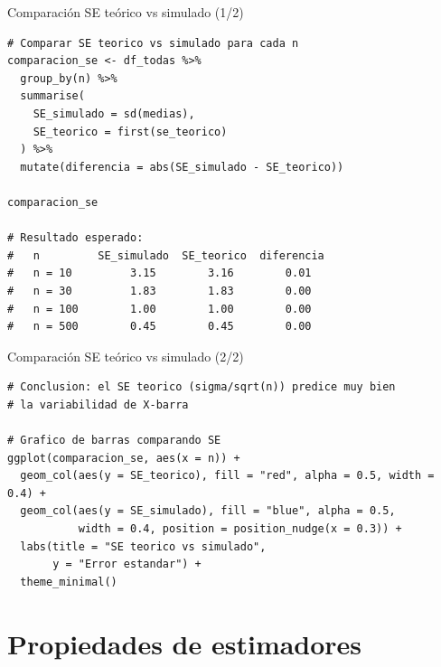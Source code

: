 \documentclass[aspectratio=169, 11pt]{beamer}
\begin{document}
\begin{frame}[fragile]{Comparación SE teórico vs simulado (1/2)}
\begin{lstlisting}
# Comparar SE teorico vs simulado para cada n
comparacion_se <- df_todas %>%
  group_by(n) %>%
  summarise(
    SE_simulado = sd(medias),
    SE_teorico = first(se_teorico)
  ) %>%
  mutate(diferencia = abs(SE_simulado - SE_teorico))

comparacion_se

# Resultado esperado:
#   n         SE_simulado  SE_teorico  diferencia
#   n = 10         3.15        3.16        0.01
#   n = 30         1.83        1.83        0.00
#   n = 100        1.00        1.00        0.00
#   n = 500        0.45        0.45        0.00
\end{lstlisting}
\end{frame}

\begin{frame}[fragile]{Comparación SE teórico vs simulado (2/2)}
\begin{lstlisting}
# Conclusion: el SE teorico (sigma/sqrt(n)) predice muy bien
# la variabilidad de X-barra

# Grafico de barras comparando SE
ggplot(comparacion_se, aes(x = n)) +
  geom_col(aes(y = SE_teorico), fill = "red", alpha = 0.5, width = 0.4) +
  geom_col(aes(y = SE_simulado), fill = "blue", alpha = 0.5,
           width = 0.4, position = position_nudge(x = 0.3)) +
  labs(title = "SE teorico vs simulado",
       y = "Error estandar") +
  theme_minimal()
\end{lstlisting}
\end{frame}

\section{Propiedades de estimadores}
\end{document}
